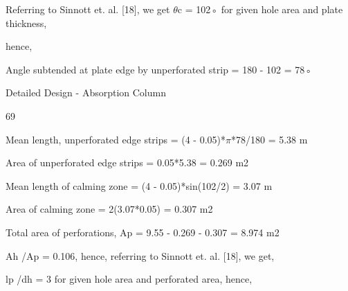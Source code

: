 \documentclass[a4paper,portrait,12pt]{article}
\begin{document}
\begin{flushleft}
Referring to Sinnott et. al. [18], we get $\theta$c = 102◦ for given hole area and plate thickness,
\end{flushleft}


\begin{flushleft}
hence,
\end{flushleft}


\begin{flushleft}
Angle subtended at plate edge by unperforated strip = 180 - 102 = 78◦
\end{flushleft}





\begin{flushleft}
\newpage
Detailed Design - Absorption Column
\end{flushleft}





69





\begin{flushleft}
Mean length, unperforated edge strips = (4 - 0.05)*$\pi$*78/180 = 5.38 m
\end{flushleft}


\begin{flushleft}
Area of unperforated edge strips = 0.05*5.38 = 0.269 m2
\end{flushleft}


\begin{flushleft}
Mean length of calming zone = (4 - 0.05)*sin(102/2) = 3.07 m
\end{flushleft}


\begin{flushleft}
Area of calming zone = 2(3.07*0.05) = 0.307 m2
\end{flushleft}


\begin{flushleft}
Total area of perforations, Ap = 9.55 - 0.269 - 0.307 = 8.974 m2
\end{flushleft}


\begin{flushleft}
Ah /Ap = 0.106, hence, referring to Sinnott et. al. [18], we get,
\end{flushleft}


\begin{flushleft}
lp /dh = 3 for given hole area and perforated area, hence,
\end{flushleft}
\end{document}

